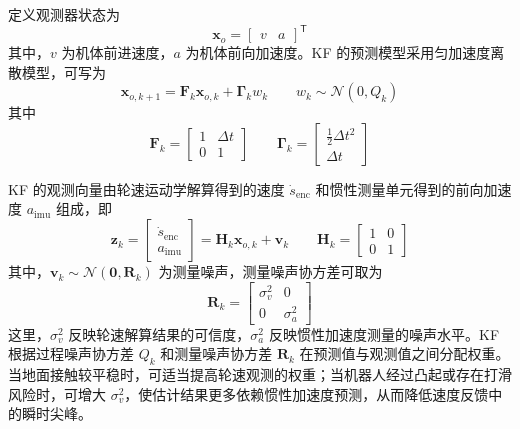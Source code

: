 定义观测器状态为
\begin{equation}
  \boldsymbol{x}_{o}
  =
  \begin{bmatrix}
    v & a
  \end{bmatrix}^{\mathsf{T}}
  \label{eq:observer-state}
\end{equation}
其中，$v$ 为机体前进速度，$a$ 为机体前向加速度。KF 的预测模型采用匀加速度离散模型，可写为
\begin{equation}
  \boldsymbol{x}_{o,k+1}
  =
  \boldsymbol{F}_k \boldsymbol{x}_{o,k}
  +
  \boldsymbol{\Gamma}_k w_k
  \qquad
  w_k \sim \mathcal{N}(0,Q_k)
  \label{eq:observer-process}
\end{equation}
其中
\begin{equation}
  \boldsymbol{F}_k
  =
  \begin{bmatrix}
    1 & \Delta t \\
    0 & 1
  \end{bmatrix}
  \qquad
  \boldsymbol{\Gamma}_k
  =
  \begin{bmatrix}
    \frac{1}{2}\Delta t^2 \\
    \Delta t
  \end{bmatrix}
  \label{eq:observer-matrix}
\end{equation}

KF 的观测向量由轮速运动学解算得到的速度 $\dot{s}_{\mathrm{enc}}$ 和惯性测量单元得到的前向加速度 $a_{\mathrm{imu}}$ 组成，即
\begin{equation}
  \boldsymbol{z}_k
  =
  \begin{bmatrix}
    \dot{s}_{\mathrm{enc}} \\
    a_{\mathrm{imu}}
  \end{bmatrix}
  =
  \boldsymbol{H}_k \boldsymbol{x}_{o,k}
  +
  \boldsymbol{v}_k
  \qquad
  \boldsymbol{H}_k
  =
  \begin{bmatrix}
    1 & 0 \\
    0 & 1
  \end{bmatrix}
  \label{eq:observer-measurement}
\end{equation}
其中，$\boldsymbol{v}_k \sim \mathcal{N}(\boldsymbol{0},\boldsymbol{R}_k)$ 为测量噪声，测量噪声协方差可取为
\begin{equation}
  \boldsymbol{R}_k
  =
  \begin{bmatrix}
    \sigma_v^2 & 0 \\
    0 & \sigma_a^2
  \end{bmatrix}
  \label{eq:observer-noise}
\end{equation}
这里，$\sigma_v^2$ 反映轮速解算结果的可信度，$\sigma_a^2$ 反映惯性加速度测量的噪声水平。KF 根据过程噪声协方差 $Q_k$ 和测量噪声协方差 $\boldsymbol{R}_k$ 在预测值与观测值之间分配权重。当地面接触较平稳时，可适当提高轮速观测的权重；当机器人经过凸起或存在打滑风险时，可增大 $\sigma_v^2$，使估计结果更多依赖惯性加速度预测，从而降低速度反馈中的瞬时尖峰。

